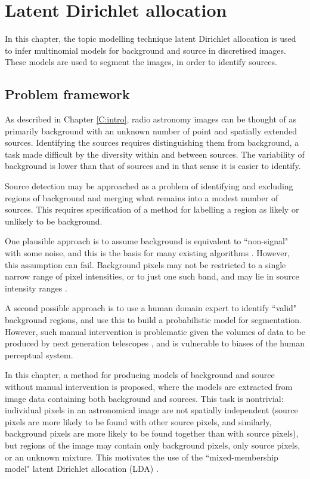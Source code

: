 \chapter{Latent Dirichlet allocation}\label{C:LDA}

In this chapter, the topic modelling technique latent Dirichlet allocation \cite{blei2003latent} is used to infer multinomial models for background and source in discretised images. These models are used to segment the images, in order to identify sources.

\section{Problem framework}
As described in Chapter \ref{C:intro}, radio astronomy images can be thought of as primarily background with an unknown number of point and spatially extended sources. Identifying the sources requires distinguishing them from background, a task made difficult by the diversity within and between sources. The variability of background is lower than that of sources and in that sense it is easier to identify. 

Source detection may be approached as a problem of identifying and excluding regions of background and merging what remains into a modest number of sources. This requires specification of a method for labelling a region as likely or unlikely to be background.

One plausible approach is to assume background is equivalent to ``non-signal" with some noise, and this is the basis for many existing algorithms \cite{masias2012review}. However, this assumption can fail. Background pixels may not be restricted to a single narrow range of pixel intensities, or to just one such band, and may lie in source intensity ranges \cite{norris2011emu}. 

A second possible approach is to use a human domain expert to identify ``valid" background regions, and use this to build a probabilistic model for segmentation. However, such manual intervention is problematic given the volumes of data to be produced by next generation telescopes \cite{norris2011emu}, and is vulnerable to biases of the human perceptual system.

In this chapter, a method for producing models of background and source without manual intervention is proposed, where the models are extracted from image data containing both background and sources. This task is nontrivial: individual pixels in an astronomical image are not spatially independent (source pixels are more likely to be found with other source pixels, and similarly, background pixels are more likely to be found together than with source pixels), but regions of the image may contain only background pixels, only source pixels, or an unknown mixture. This motivates the use of the ``mixed-membership model" latent Dirichlet allocation (LDA) \cite{blei2003latent}. 

